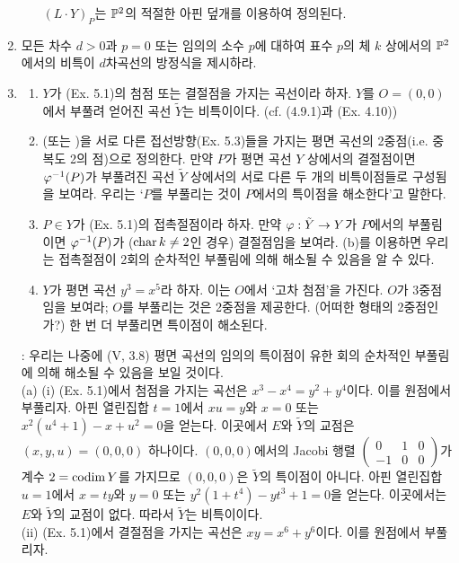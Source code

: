 \begin{enumerate}[label=\tb{5.\arabic*.},itemindent=0mm,itemsep=4mm]
\begin{enumerate}[label=(\alph*)]
			$(L\cdot Y)_P$는 $\mathbb{P}^2$의 적절한 아핀 덮개를 이용하여 정의된다.
		\end{enumerate}
	\item 모든 차수 $d>0$과 $p=0$ 또는 임의의 소수 $p$에 대하여 표수 $p$의 체 $k$ 상에서의
	$\mathbb{P}^2$에서의 비특이 $d$차곡선의 방정식을 제시하라.
	\item {}
	\begin{enumerate}[label=(\alph*)]
	\item $Y$가 (Ex. 5.1)의 첨점 또는 결절점을 가지는 곡선이라 하자.
	$Y$를 $O=(0,0)$에서 부풀려 얻어진 곡선 $\tilde Y$는 비특이이다. (cf. (4.9.1)과 (Ex. 4.10))
	\item {}(또는 )을 서로 다른 접선방향(Ex. 5.3)들을 가지는
	평면 곡선의 2중점(i.e. 중복도 2의 점)으로 정의한다.
	만약 $P$가 평면 곡선 $Y$ 상에서의 결절점이면 $\varphi^{-1}(P)$가 부풀려진 곡선 $\tilde Y$ 상에서의
	서로 다른 두 개의 비특이점들로 구성됨을 보여라. 우리는 `$P$를 부풀리는 것이 $P$에서의 특이점을 해소한다'고 말한다.
	\item $P\in Y$가 (Ex. 5.1)의 접촉절점이라 하자.
	만약 $\varphi:\tilde Y\rightarrow Y$가 $P$에서의 부풀림이면 $\varphi^{-1}(P)$가 ($\operatorname{char} k\ne 2$인 경우) 결절점임을 보여라.
	(b)를 이용하면 우리는 접촉절점이 2회의 순차적인 부풀림에 의해 해소될 수 있음을 알 수 있다.
	\item $Y$가 평면 곡선 $y^3=x^5$라 하자. 이는 $O$에서 `고차 첨점'을 가진다.
	$O$가 3중점임을 보여라; $O$를 부풀리는 것은 2중점을 제공한다. (어떠한 형태의 2중점인가?) 한 번 더 부풀리면 특이점이 해소된다.
	\end{enumerate}
	: 우리는 나중에 (V, 3.8) 평면 곡선의 임의의 특이점이 유한 회의 순차적인 부풀림에 의해 해소될 수 있음을 보일 것이다.\\
	\sol (a) (i) (Ex. 5.1)에서 첨점을 가지는 곡선은 $x^3-x^4=y^2+y^4$이다. 이를 원점에서 부풀리자.
	아핀 열린집합 $t=1$에서 $xu=y$와 $x=0$ 또는 $x^2(u^4+1)-x+u^2=0$을 얻는다.
	이곳에서 $E$와 $\tilde Y$의 교점은 $(x,y,u)=(0,0,0)$ 하나이다.
	$(0,0,0)$에서의 Jacobi 행렬 $\left(\begin{array}{ccc}0&1&0\\-1&0&0\end{array}\right)$가
	계수 $2=\operatorname{codim} Y$를 가지므로 $(0,0,0)$은 $\tilde Y$의 특이점이 아니다.
	아핀 열린집합 $u=1$에서 $x=ty$와 $y=0$ 또는 $y^2(1+t^4)-yt^3+1=0$을 얻는다.
	이곳에서는 $E$와 $\tilde Y$의 교점이 없다. 따라서 $\tilde Y$는 비특이이다.\\
	(ii) (Ex. 5.1)에서 결절점을 가지는 곡선은 $xy=x^6+y^6$이다. 이를 원점에서 부풀리자.

\end{enumerate}
